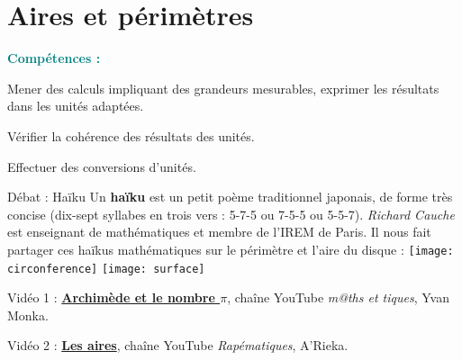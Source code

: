 \graphicspath{{../../S15_Perimetre_et_aire/Images/}}

\themeM
\chapter{Aires et périmètres}
\label{S15}

\textcolor{teal}{\bf Compétences :}
   \begin{competences}
      \item Mener des calculs impliquant des grandeurs mesurables, exprimer les résultats dans les unités adaptées.
      \item Vérifier la cohérence des résultats des unités.
      \item Effectuer des conversions d’unités.
   \end{competences}

\vfill

\begin{debat}{Débat : Haïku}
   Un {\bf haïku} est un petit poème traditionnel japonais, de forme très concise (dix-sept syllabes en trois vers : 5-7-5 ou 7-5-5 ou 5-5-7). {\it Richard Cauche} est enseignant de mathématiques et membre de l’IREM de Paris. Il nous fait partager ces haïkus mathématiques sur le périmètre et l'aire du disque :
   \tcblower
      \texttt{[image: circonference]}
      \hspace{10mm}
      \texttt{[image: surface]}
\end{debat}

\hfill {\gray Vidéo 1 : \href{https://www.youtube.com/watch?v=TcNfC8b4hUg}{\bf Archimède et le nombre $\pi$}, chaîne YouTube {\it m@ths et tiques}, Yvan Monka}. \par
\hfill {\gray Vidéo 2 : \href{https://www.youtube.com/watch?v=TdwteXrJsVU}{\bf Les aires}, chaîne YouTube {\it Rapématiques}, A'Rieka}.


